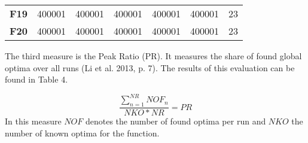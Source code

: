 \documentclass[12pt,a4paper]{article}
\begin{document}
\begin{longtable}[c]{@{}crrrrrr@{}}
\begin{minipage}[t]{0.11\columnwidth}
\textbf{F19}
\strut\end{minipage} &
\begin{minipage}[t]{0.08\columnwidth}\raggedleft\strut
400001
\strut\end{minipage} &
\begin{minipage}[t]{0.08\columnwidth}\raggedleft\strut
400001
\strut\end{minipage} &
\begin{minipage}[t]{0.09\columnwidth}\raggedleft\strut
400001
\strut\end{minipage} &
\begin{minipage}[t]{0.10\columnwidth}\raggedleft\strut
400001
\strut\end{minipage} &
\begin{minipage}[t]{0.11\columnwidth}\raggedleft\strut
400001
\strut\end{minipage} &
\begin{minipage}[t]{0.07\columnwidth}\raggedleft\strut
23
\strut\end{minipage}\tabularnewline
\begin{minipage}[t]{0.11\columnwidth}\centering\strut
\textbf{F20}
\strut\end{minipage} &
\begin{minipage}[t]{0.08\columnwidth}\raggedleft\strut
400001
\strut\end{minipage} &
\begin{minipage}[t]{0.08\columnwidth}\raggedleft\strut
400001
\strut\end{minipage} &
\begin{minipage}[t]{0.09\columnwidth}\raggedleft\strut
400001
\strut\end{minipage} &
\begin{minipage}[t]{0.10\columnwidth}\raggedleft\strut
400001
\strut\end{minipage} &
\begin{minipage}[t]{0.11\columnwidth}\raggedleft\strut
400001
\strut\end{minipage} &
\begin{minipage}[t]{0.07\columnwidth}\raggedleft\strut
23
\strut\end{minipage}\tabularnewline
\bottomrule
\end{longtable}

The third measure is the Peak Ratio (PR). It measures the share of found
global optima over all runs (Li et al. 2013, p. 7). The results of this
evaluation can be found in Table 4.

\[\frac{\sum\nolimits_{n=1}^{NR} NOF_{n}}{NKO * NR} = PR\] \newline
In this measure \(NOF\) denotes the number of found optima per run and
\(NKO\) the number of known optima for the function. \newline
\end{document}
